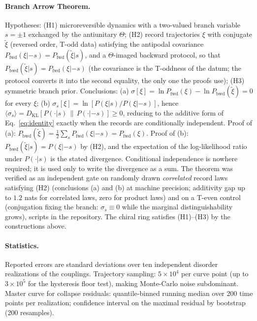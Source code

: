 \documentclass[11pt]{article}
\begin{document}
\paragraph{Branch Arrow Theorem.}
Hypotheses: (H1) microreversible dynamics with a two-valued branch variable $s = \pm 1$ exchanged by the antiunitary $\Theta$; (H2) record trajectories $\xi$ with conjugate $\tilde\xi$ (reversed order, T-odd data) satisfying the antipodal covariance $P_{\mathrm{fwd}}(\xi|{-s}) = P_{\mathrm{fwd}}(\tilde\xi|s)$, and a $\Theta$-imaged backward protocol, so that $P_{\mathrm{bwd}}(\tilde\xi|s) = P_{\mathrm{fwd}}(\xi|{-s})$ (the covariance is the T-oddness of the datum; the protocol converts it into the second equality, the only one the proofs use); (H3) symmetric branch prior. Conclusions: (a) $\sigma[\xi] = \ln P_{\mathrm{fwd}}(\xi) - \ln P_{\mathrm{bwd}}(\tilde\xi) = 0$ for every $\xi$; (b) $\sigma_s[\xi] = \ln[P(\xi|s)/P(\xi|{-s})]$, hence $\langle\sigma_s\rangle = D_{\mathrm{KL}}[P(\cdot|s)\,\|\,P(\cdot|{-s})] \ge 0$, reducing to the additive form of Eq.~\eqref{eq:identity} exactly when the records are conditionally independent. Proof of (a): $P_{\mathrm{bwd}}(\tilde\xi) = \tfrac12\sum_s P_{\mathrm{fwd}}(\xi|{-s}) = P_{\mathrm{fwd}}(\xi)$. Proof of (b): $P_{\mathrm{bwd}}(\tilde\xi|s) = P(\xi|{-s})$ by (H2), and the expectation of the log-likelihood ratio under $P(\cdot|s)$ is the stated divergence. Conditional independence is nowhere required; it is used only to write the divergence as a sum. The theorem was verified as an independent gate on randomly drawn \emph{correlated} record laws satisfying (H2) (conclusions (a) and (b) at machine precision; additivity gap up to $1.2$ nats for correlated laws, zero for product laws) and on a T-even control (conjugation fixing the branch: $\sigma_s \equiv 0$ while the marginal distinguishability grows), scripts in the repository. The chiral ring satisfies (H1)--(H3) by the constructions above.

\paragraph{Statistics.}
Reported errors are standard deviations over ten independent disorder realizations of the couplings. Trajectory sampling: $5\times10^4$ per curve point (up to $3\times10^5$ for the hysteresis floor test), making Monte-Carlo noise subdominant. Master curve for collapse residuals: quantile-binned running median over 200 time points per realization; confidence interval on the maximal residual by bootstrap (200 resamples).
\end{document}
